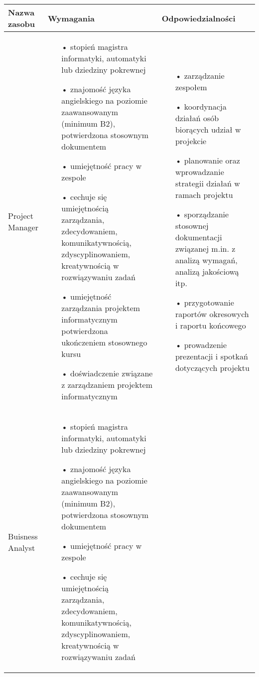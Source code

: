 \begin{center}
    \begin{longtable}{ | l | p{5cm} | p{5cm} |}
    \hline
    Nazwa zasobu & Wymagania & Odpowiedzialności \\ \hline
    Project Manager & 
    \begin{itemize}
	\item[•] stopień magistra informatyki, automatyki lub dziedziny pokrewnej 
	\item[•] znajomość języka angielskiego na poziomie zaawansowanym (minimum B2), potwierdzona stosownym dokumentem
	\item[•] umiejętność pracy w zespole
	\item[•] cechuje się  umiejętnością zarządzania,  zdecydowaniem, komunikatywnością, zdyscyplinowaniem, kreatywnością w rozwiązywaniu zadań 
	\item[•] umiejętność zarządzania projektem informatycznym potwierdzona ukończeniem stosownego kursu 
	\item[•] doświadczenie związane z zarządzaniem projektem informatycznym
	\end{itemize}	    	
     & 
	\begin{itemize}
	\item[•] zarządzanie zespołem
	\item[•] koordynacja działań osób biorących udział w projekcie
	\item[•] planowanie oraz wprowadzanie strategii działań w ramach projektu
	\item[•] sporządzanie stosownej dokumentacji związanej m.in. z analizą wymagań, analizą jakościową itp.
	\item[•] przygotowanie raportów okresowych i raportu końcowego
	\item[•] prowadzenie prezentacji i spotkań dotyczących projektu
	\end{itemize}	   
	\\ \hline
    Buisness Analyst & 
    \begin{itemize}
	\item[•] stopień magistra informatyki, automatyki lub dziedziny pokrewnej 
	\item[•] znajomość języka angielskiego na poziomie zaawansowanym (minimum B2), potwierdzona stosownym dokumentem
	\item[•] umiejętność pracy w zespole
	\item[•] cechuje się  umiejętnością zarządzania,  zdecydowaniem, komunikatywnością, zdyscyplinowaniem, kreatywnością w rozwiązywaniu zadań 

\end{itemize}
\end{longtable}
\end{center}
